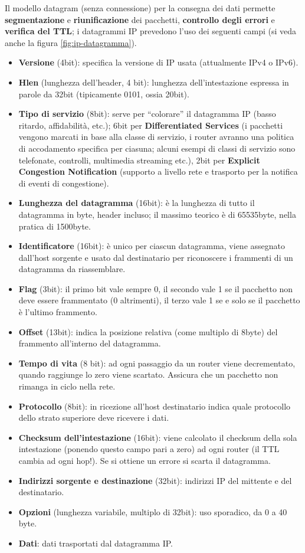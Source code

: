 \documentclass[11pt, italian, openany]{book}
\begin{document}
\begin{sloppypar}
Il modello datagram (senza connessione) per la consegna dei dati permette \textbf{segmentazione} e \textbf{riunificazione} dei pacchetti, \textbf{controllo
degli errori} e \textbf{verifica del TTL}; i datagrammi IP prevedono l'uso dei seguenti campi (si veda anche la figura \ref{fig:ip-datagramma}).
\begin{itemize}[itemsep=0pt, topsep=0pt, parsep=0pt]
	\item \textbf{Versione} (4bit): specifica la versione di IP usata (attualmente IPv4 o IPv6).
	\item \textbf{Hlen} (lunghezza dell'header, 4 bit): lunghezza dell'intestazione espressa in parole da 32bit (tipicamente 0101, ossia 20bit).
	\item \textbf{Tipo di servizio} (8bit): serve per ``colorare'' il datagramma IP (basso ritardo, affidabilit\`a, etc.); 6bit per \textbf{Differentiated
	Services} (i pacchetti vengono marcati in base alla classe di servizio, i router avranno una politica di accodamento specifica per ciasuna; alcuni esempi
	di classi di servizio sono telefonate, controlli, multimedia streaming etc.), 2bit per \textbf{Explicit Congestion Notification} (supporto a livello
	rete e trasporto per la notifica di eventi di congestione).
	\item \textbf{Lunghezza del datagramma} (16bit): \`e la lunghezza di tutto il datagramma in byte, header incluso; il massimo teorico \`e di 65535byte, nella
	pratica di 1500byte.
	\item \textbf{Identificatore} (16bit): \`e unico per ciascun datagramma, viene assegnato dall'host sorgente e usato dal destinatario per riconoscere i
	frammenti di un datagramma da riassemblare.
	\item \textbf{Flag} (3bit): il primo bit vale sempre 0, il secondo vale 1 se il pacchetto non deve essere frammentato (0 altrimenti), il terzo vale 1 se e
	solo se il pacchetto \`e l'ultimo frammento.
	\item \textbf{Offset} (13bit): indica la posizione relativa (come multiplo di 8byte) del frammento all'interno del datagramma.
	\item \textbf{Tempo di vita} (8 bit): ad ogni passaggio da un router viene decrementato, quando raggiunge lo zero viene scartato. Assicura che un pacchetto
	non rimanga in ciclo nella rete.
	\item \textbf{Protocollo} (8bit): in ricezione all'host destinatario indica quale protocollo dello strato superiore deve ricevere i dati.
	\item \textbf{Checksum dell'intestazione} (16bit): viene calcolato il checksum della sola intestazione (ponendo questo campo pari a zero) ad ogni
	router (il TTL cambia ad ogni hop!). Se si ottiene un errore si scarta il datagramma.
	\item \textbf{Indirizzi sorgente e destinazione} (32bit): indirizzi IP del mittente e del destinatario.
	\item \textbf{Opzioni} (lunghezza variabile, multiplo di 32bit): uso sporadico, da 0 a 40 byte.
	\item \textbf{Dati}: dati trasportati dal datagramma IP.
\end{itemize}


\end{sloppypar}
\end{document}
